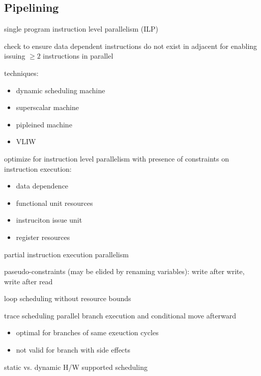 \documentclass[8pt]{extarticle}
\begin{document}
\begin{multicols*}{2}
  \vfill\null
  \columnbreak

  \section{Pipelining}

  single program instruction level parallelism (ILP)

  check to ensure data dependent instructions do not exist in adjacent for enabling issuing $\geq2$ instructions in parallel

  techniques:

  \begin{itemize}
  \item dynamic scheduling machine
  \item superscalar machine
  \item pipleined machine
  \item VLIW
  \end{itemize}

  optimize for instruction level parallelism with presence of constraints on instruction execution:
  \begin{itemize}
  \item data dependence
  \item functional unit resources
  \item instruciton issue unit
  \item register resources
  \end{itemize}

  partial instruction execution parallelism

  paseudo-constraints (may be elided by renaming variables): write after write, write after read

  loop scheduling without resource bounds

  trace scheduling
  parallel branch execution and conditional move afterward
  \begin{itemize}
  \item optimal for branches of same exeuction cycles
  \item not valid for branch with side effects
  \end{itemize}

  static vs. dynamic H/W supported scheduling


\end{multicols*}
\end{document}

